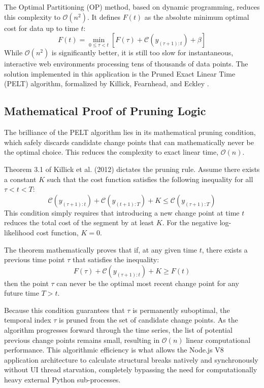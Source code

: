 The Optimal Partitioning (OP) method, based on dynamic programming, reduces this complexity to $\mathcal{O}(n^2)$. It defines $F(t)$ as the absolute minimum optimal cost for data up to time $t$:
\begin{equation}
    F(t) = \min_{0 \le \tau < t} \left[ F(\tau) + \mathcal{C}(y_{(\tau+1):t}) + \beta \right]
\end{equation}
While $\mathcal{O}(n^2)$ is significantly better, it is still too slow for instantaneous, interactive web environments processing tens of thousands of data points. The solution implemented in this application is the Pruned Exact Linear Time (PELT) algorithm, formalized by Killick, Fearnhead, and Eckley \cite{Killick2012}.

\subsection{Mathematical Proof of Pruning Logic}
The brilliance of the PELT algorithm lies in its mathematical pruning condition, which safely discards candidate change points that can mathematically never be the optimal choice. This reduces the complexity to exact linear time, $\mathcal{O}(n)$.

Theorem 3.1 of Killick et al. (2012) dictates the pruning rule. Assume there exists a constant $K$ such that the cost function satisfies the following inequality for all $\tau < t < T$:
\begin{equation}
    \mathcal{C}(y_{(\tau+1):t}) + \mathcal{C}(y_{(t+1):T}) + K \le \mathcal{C}(y_{(\tau+1):T})
\end{equation}
This condition simply requires that introducing a new change point at time $t$ reduces the total cost of the segment by at least $K$. For the negative log-likelihood cost function, $K=0$. 

The theorem mathematically proves that if, at any given time $t$, there exists a previous time point $\tau$ that satisfies the inequality:
\begin{equation}
    F(\tau) + \mathcal{C}(y_{(\tau+1):t}) + K \ge F(t)
\end{equation}
then the point $\tau$ can never be the optimal most recent change point for any future time $T > t$. 

Because this condition guarantees that $\tau$ is permanently suboptimal, the temporal index $\tau$ is pruned from the set of candidate change points. As the algorithm progresses forward through the time series, the list of potential previous change points remains small, resulting in $\mathcal{O}(n)$ linear computational performance. This algorithmic efficiency is what allows the Node.js V8 application architecture to calculate structural breaks natively and synchronously without UI thread starvation, completely bypassing the need for computationally heavy external Python sub-processes.

